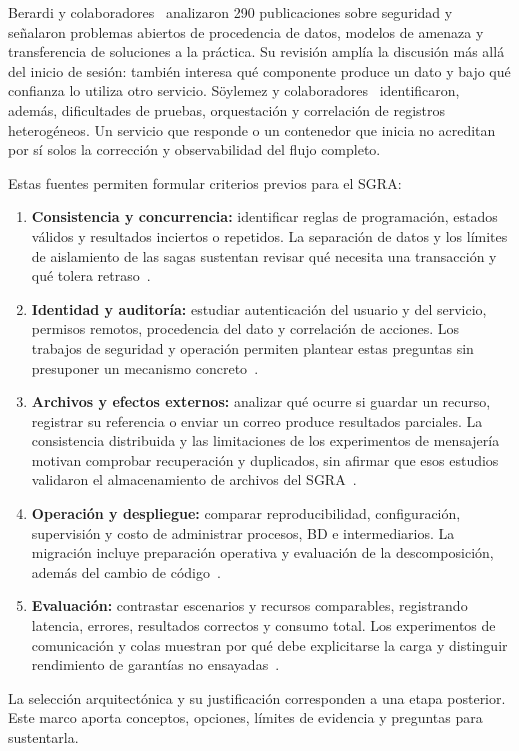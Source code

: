 Berardi y colaboradores~\cite{berardi2022-security} analizaron 290 publicaciones sobre seguridad y señalaron problemas abiertos de procedencia de datos, modelos de amenaza y transferencia de soluciones a la práctica. Su revisión amplía la discusión más allá del inicio de sesión: también interesa qué componente produce un dato y bajo qué confianza lo utiliza otro servicio. Söylemez y colaboradores~\cite{soylemez2022-challenges} identificaron, además, dificultades de pruebas, orquestación y correlación de registros heterogéneos. Un servicio que responde o un contenedor que inicia no acreditan por sí solos la corrección y observabilidad del flujo completo.

Estas fuentes permiten formular criterios previos para el SGRA:
\begin{enumerate}
\item \textbf{Consistencia y concurrencia:} identificar reglas de programación, estados válidos y resultados inciertos o repetidos. La separación de datos y los límites de aislamiento de las sagas sustentan revisar qué necesita una transacción y qué tolera retraso~\cite{ayas2023-migration,kazanavicius2022-database,daraghmi2022-saga}.
\item \textbf{Identidad y auditoría:} estudiar autenticación del usuario y del servicio, permisos remotos, procedencia del dato y correlación de acciones. Los trabajos de seguridad y operación permiten plantear estas preguntas sin presuponer un mecanismo concreto~\cite{almeida2022-authentication,berardi2022-security,soylemez2022-challenges}.
\item \textbf{Archivos y efectos externos:} analizar qué ocurre si guardar un recurso, registrar su referencia o enviar un correo produce resultados parciales. La consistencia distribuida y las limitaciones de los experimentos de mensajería motivan comprobar recuperación y duplicados, sin afirmar que esos estudios validaron el almacenamiento de archivos del SGRA~\cite{daraghmi2022-saga,maharjan2023-queues,ayas2023-migration}.
\item \textbf{Operación y despliegue:} comparar reproducibilidad, configuración, supervisión y costo de administrar procesos, BD e intermediarios. La migración incluye preparación operativa y evaluación de la descomposición, además del cambio de código~\cite{ayas2023-migration,abgaz2023-decomposition,soylemez2022-challenges}.
\item \textbf{Evaluación:} contrastar escenarios y recursos comparables, registrando latencia, errores, resultados correctos y consumo total. Los experimentos de comunicación y colas muestran por qué debe explicitarse la carga y distinguir rendimiento de garantías no ensayadas~\cite{kazanavicius2023-communication,bolanowski2022-rest-grpc,maharjan2023-queues}.
\end{enumerate}
La selección arquitectónica y su justificación corresponden a una etapa posterior. Este marco aporta conceptos, opciones, límites de evidencia y preguntas para sustentarla.
